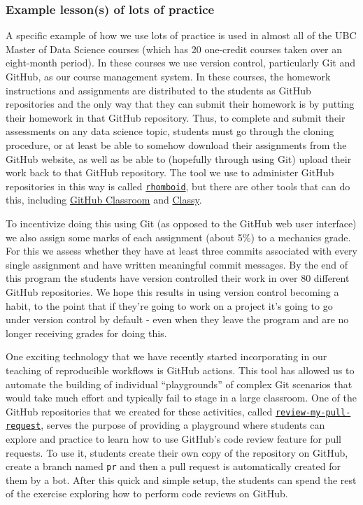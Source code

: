 \documentclass{article}
\begin{document}
\hypertarget{example-lessons-of-lots-of-practice}{%
\subsubsection{Example lesson(s) of lots of
practice}\label{example-lessons-of-lots-of-practice}}

A specific example of how we use lots of practice is used in almost all
of the UBC Master of Data Science courses (which has 20 one-credit
courses taken over an eight-month period). In these courses we use
version control, particularly Git and GitHub, as our course management
system. In these courses, the homework instructions and assignments are
distributed to the students as GitHub repositories and the only way that
they can submit their homework is by putting their homework in that
GitHub repository. Thus, to complete and submit their assessments on any
data science topic, students must go through the cloning procedure, or
at least be able to somehow download their assignments from the GitHub
website, as well as be able to (hopefully through using Git) upload
their work back to that GitHub repository. The tool we use to administer
GitHub repositories in this way is called
\href{https://github.com/mgelbart/rhomboid}{\texttt{rhomboid}}, but
there are other tools that can do this, including
\href{https://classroom.github.com/}{GitHub Classroom} and
\href{https://github.com/ubccpsc/classy}{Classy}.

To incentivize doing this using Git (as opposed to the GitHub web user
interface) we also assign some marks of each assignment (about 5\%) to a
mechanics grade. For this we assess whether they have at least three
commits associated with every single assignment and have written
meaningful commit messages. By the end of this program the students have
version controlled their work in over 80 different GitHub repositories.
We hope this results in using version control becoming a habit, to the
point that if they're going to work on a project it's going to go under
version control by default - even when they leave the program and are no
longer receiving grades for doing this.

One exciting technology that we have recently started incorporating in
our teaching of reproducible workflows is GitHub actions. This tool has
allowed us to automate the building of individual ``playgrounds'' of
complex Git scenarios that would take much effort and typically fail to
stage in a large classroom. One of the GitHub repositories that we
created for these activities, called
\href{https://github.com/ttimbers/review-my-pull-request}{\texttt{review-my-pull-request}},
serves the purpose of providing a playground where students can explore
and practice to learn how to use GitHub's code review feature for pull
requests. To use it, students create their own copy of the repository on
GitHub, create a branch named \texttt{pr} and then a pull request is
automatically created for them by a bot. After this quick and simple
setup, the students can spend the rest of the exercise exploring how to
perform code reviews on GitHub.
\end{document}
